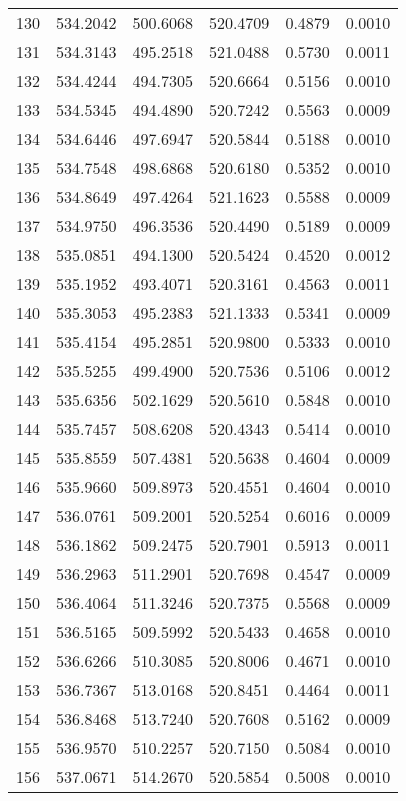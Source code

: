 \documentclass{article}
\begin{document}
\begin{longtable}{|c|c|c|c|c|c|}
130 & 534.2042 & 500.6068 & 520.4709 & 0.4879 & 0.0010 \\
131 & 534.3143 & 495.2518 & 521.0488 & 0.5730 & 0.0011 \\
132 & 534.4244 & 494.7305 & 520.6664 & 0.5156 & 0.0010 \\
133 & 534.5345 & 494.4890 & 520.7242 & 0.5563 & 0.0009 \\
134 & 534.6446 & 497.6947 & 520.5844 & 0.5188 & 0.0010 \\
135 & 534.7548 & 498.6868 & 520.6180 & 0.5352 & 0.0010 \\
136 & 534.8649 & 497.4264 & 521.1623 & 0.5588 & 0.0009 \\
137 & 534.9750 & 496.3536 & 520.4490 & 0.5189 & 0.0009 \\
138 & 535.0851 & 494.1300 & 520.5424 & 0.4520 & 0.0012 \\
139 & 535.1952 & 493.4071 & 520.3161 & 0.4563 & 0.0011 \\
140 & 535.3053 & 495.2383 & 521.1333 & 0.5341 & 0.0009 \\
141 & 535.4154 & 495.2851 & 520.9800 & 0.5333 & 0.0010 \\
142 & 535.5255 & 499.4900 & 520.7536 & 0.5106 & 0.0012 \\
143 & 535.6356 & 502.1629 & 520.5610 & 0.5848 & 0.0010 \\
144 & 535.7457 & 508.6208 & 520.4343 & 0.5414 & 0.0010 \\
145 & 535.8559 & 507.4381 & 520.5638 & 0.4604 & 0.0009 \\
146 & 535.9660 & 509.8973 & 520.4551 & 0.4604 & 0.0010 \\
147 & 536.0761 & 509.2001 & 520.5254 & 0.6016 & 0.0009 \\
148 & 536.1862 & 509.2475 & 520.7901 & 0.5913 & 0.0011 \\
149 & 536.2963 & 511.2901 & 520.7698 & 0.4547 & 0.0009 \\
150 & 536.4064 & 511.3246 & 520.7375 & 0.5568 & 0.0009 \\
151 & 536.5165 & 509.5992 & 520.5433 & 0.4658 & 0.0010 \\
152 & 536.6266 & 510.3085 & 520.8006 & 0.4671 & 0.0010 \\
153 & 536.7367 & 513.0168 & 520.8451 & 0.4464 & 0.0011 \\
154 & 536.8468 & 513.7240 & 520.7608 & 0.5162 & 0.0009 \\
155 & 536.9570 & 510.2257 & 520.7150 & 0.5084 & 0.0010 \\
156 & 537.0671 & 514.2670 & 520.5854 & 0.5008 & 0.0010 \\

\end{longtable}
\end{document}
